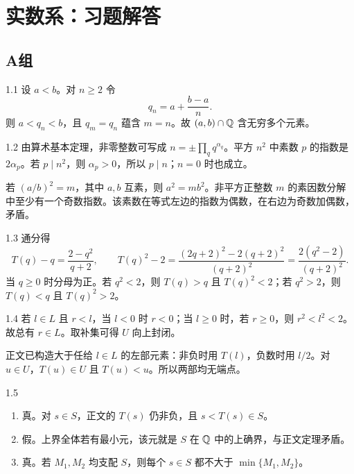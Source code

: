 \chapter{实数系：习题解答}

\section*{A组}

\begin{solution}{1.1}
设 \(a<b\)。对 \(n\ge2\) 令
\[
 q_n=a+\frac{b-a}{n}.
\]
则 \(a<q_n<b\)，且 \(q_m=q_n\) 蕴含 \(m=n\)。故 \((a,b)\cap\mathbb{Q}\) 含无穷多个元素。
\end{solution}

\begin{solution}{1.2}
由算术基本定理，非零整数可写成 \(n=\pm\prod_q q^{\alpha_q}\)。平方 \(n^2\) 中素数 \(p\) 的指数是 \(2\alpha_p\)。若 \(p\mid n^2\)，则 \(\alpha_p>0\)，所以 \(p\mid n\)；\(n=0\) 时也成立。

若 \((a/b)^2=m\)，其中 \(a,b\) 互素，则 \(a^2=mb^2\)。非平方正整数 \(m\) 的素因数分解中至少有一个奇数指数。该素数在等式左边的指数为偶数，在右边为奇数加偶数，矛盾。
\end{solution}

\begin{solution}{1.3}
通分得
\[
 T(q)-q=\frac{2-q^2}{q+2},\qquad
 T(q)^2-2=\frac{(2q+2)^2-2(q+2)^2}{(q+2)^2}
 =\frac{2(q^2-2)}{(q+2)^2}.
\]
当 \(q\ge0\) 时分母为正。若 \(q^2<2\)，则 \(T(q)>q\) 且 \(T(q)^2<2\)；若 \(q^2>2\)，则 \(T(q)<q\) 且 \(T(q)^2>2\)。
\end{solution}

\begin{solution}{1.4}
若 \(l\in L\) 且 \(r<l\)，当 \(l<0\) 时 \(r<0\)；当 \(l\ge0\) 时，若 \(r\ge0\)，则 \(r^2<l^2<2\)。故总有 \(r\in L\)。取补集可得 \(U\) 向上封闭。

正文已构造大于任给 \(l\in L\) 的左部元素：非负时用 \(T(l)\)，负数时用 \(l/2\)。对 \(u\in U\)，\(T(u)\in U\) 且 \(T(u)<u\)。所以两部均无端点。
\end{solution}

\begin{solution}{1.5}
\begin{enumerate}[label=(\arabic*)]
 \item 真。对 \(s\in S\)，正文的 \(T(s)\) 仍非负，且 \(s<T(s)\in S\)。
 \item 假。上界全体若有最小元，该元就是 \(S\) 在 \(\mathbb{Q}\) 中的上确界，与正文定理矛盾。
 \item 真。若 \(M_1,M_2\) 均支配 \(S\)，则每个 \(s\in S\) 都不大于 \(\min\{M_1,M_2\}\)。
\end{enumerate}
\end{solution}

